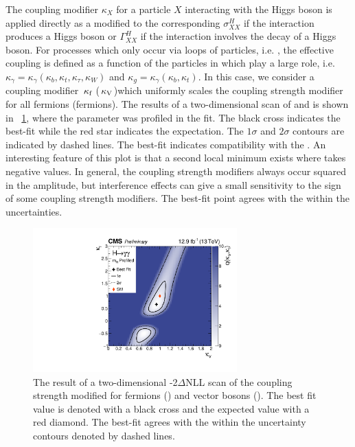 The coupling modifier  $\kappa_{X}$ for a particle $X$ interacting with the Higgs boson is applied directly as a modified to the corresponding $\sigma_{XX}^{H}$ if the interaction produces a Higgs boson or $\Gamma^{H}_{XX}$ if the interaction involves the decay of  a Higgs boson. For processes which only occur via loops of particles, i.e. \Hgg, the effective coupling is defined as a function of the particles in which play a large role, i.e. $\kappa_{\gamma} = \kappa_{\gamma}(\kappa_b, \kappa_t,\kappa_\tau,\kappa_W) $ and $\kappa_{g} = \kappa_{\gamma}(\kappa_b, \kappa_t) $. In this case, we consider a  coupling modifier $\,\kappa_\text{f}$ ($\,\kappa_\text{V}$)which uniformly scales the coupling strength modifier for all fermions (fermions). The results of a two-dimensional \DNLL scan of \kf and \kV is shown in \Fig~\ref{fig:statandresults:kappa_plots_kvkf}, where the \mH parameter was profiled in the fit. The black cross indicates the best-fit while the red star indicates the \SM expectation. The $1\sigma$ and $2\sigma$ contours are indicated by dashed lines. The best-fit indicates compatibility with the \SM. An interesting feature of this plot is that a second local minimum exists where \kf takes negative values. In general, the coupling strength modifiers always occur squared in the amplitude, but interference effects can give a small sensitivity to the sign of some coupling strength modifiers. The best-fit point agrees with the \SM within the uncertainties.

\begin{figure}[ht!]
\centering
\includegraphics[width=0.7\textwidth]{statandresultsFigures/CVCFScanProfileMH_granular_col.pdf} 
\caption{The result of a two-dimensional -2$\Delta$NLL scan of the coupling strength modified for fermions (\kf) and vector bosons (\kV). The best fit value is denoted with a black cross and the \SM expected value with a red diamond. The best-fit agrees with the \SM within the uncertainty contours denoted by dashed lines. }

\label{fig:statandresults:kappa_plots_kvkf}
\end{figure}

